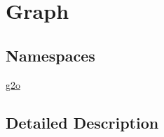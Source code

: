 \hypertarget{group__graph}{}\section{Graph}
\label{group__graph}
\subsection*{Namespaces}
\begin{DoxyCompactItemize}
\item 
 \mbox{\hyperlink{namespaceg2o}{g2o}}
\end{DoxyCompactItemize}


\subsection{Detailed Description}
